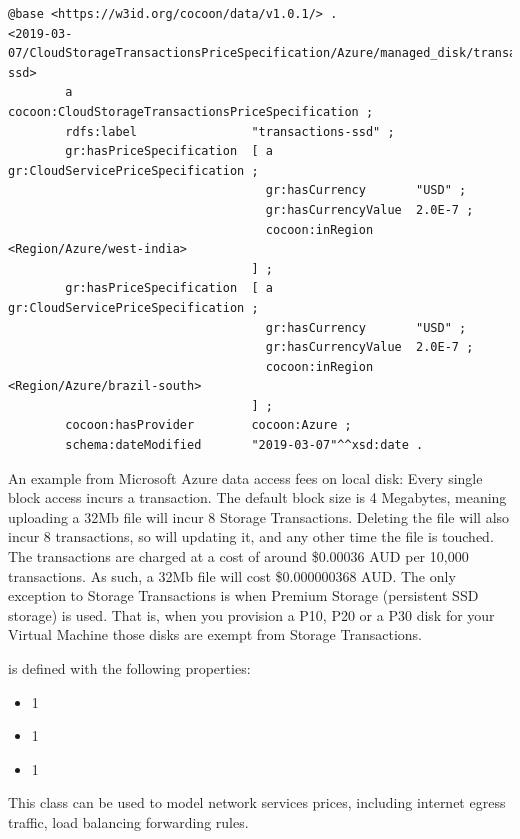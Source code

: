 \begin{lstlisting}[caption={Storage Transactions Price Specification},label={lst:StorageTransactionsPriceSpecification}]
@base <https://w3id.org/cocoon/data/v1.0.1/> .
<2019-03-07/CloudStorageTransactionsPriceSpecification/Azure/managed_disk/transactions-ssd>
        a                         cocoon:CloudStorageTransactionsPriceSpecification ;
        rdfs:label                "transactions-ssd" ;
        gr:hasPriceSpecification  [ a                    gr:CloudServicePriceSpecification ;
                                    gr:hasCurrency       "USD" ;
                                    gr:hasCurrencyValue  2.0E-7 ;
                                    cocoon:inRegion      <Region/Azure/west-india>
                                  ] ;
        gr:hasPriceSpecification  [ a                    gr:CloudServicePriceSpecification ;
                                    gr:hasCurrency       "USD" ;
                                    gr:hasCurrencyValue  2.0E-7 ;
                                    cocoon:inRegion      <Region/Azure/brazil-south>
                                  ] ;
        cocoon:hasProvider        cocoon:Azure ;
        schema:dateModified       "2019-03-07"^^xsd:date .
\end{lstlisting}

An example from Microsoft Azure\cite{data_access_fees_local_disk_AzureVM} 
data access fees on local disk:
Every single block access incurs a transaction. The default block size is 4 Megabytes, meaning uploading a 32Mb file will incur 8 Storage Transactions. Deleting the file will also incur 8 transactions, so will updating it, and any other time the file is touched.
The transactions are charged at a cost of around \$0.00036 AUD per 10,000 transactions. As such, a 32Mb file will cost \$0.000000368 AUD.
The only exception to Storage Transactions is when Premium Storage (persistent SSD storage) is used. That is, when you provision a P10, P20 or a P30 disk for your Virtual Machine those disks are exempt from Storage Transactions.

\label{sec:NetworkPriceSpecification}
 is defined with the following properties:
\begin{itemize}
  \item[]   1 
  \item[]   1 
  \item[]   1 
\end{itemize}
This class can be used to model network services prices, including internet egress traffic, load balancing forwarding rules.

